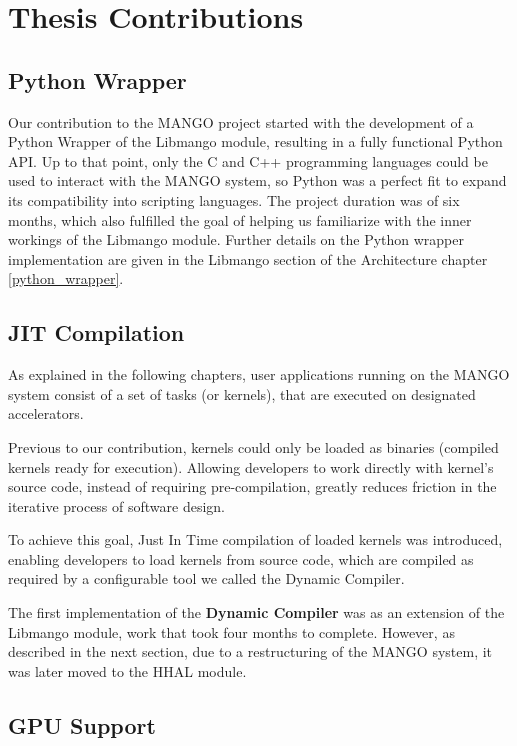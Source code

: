 \section{Thesis Contributions}
\subsection{Python Wrapper}

Our contribution to the MANGO project started with the development of a Python Wrapper of the Libmango module, resulting in a fully functional Python API. Up to that point, only the C and C++ programming languages could be used to interact with the MANGO system, so Python was a perfect fit to expand its compatibility into scripting languages. The project duration was of six months, which also fulfilled the goal of helping us familiarize with the inner workings of the Libmango module. Further details on the Python wrapper implementation are given in the Libmango section of the Architecture chapter \ref{python_wrapper}.

\subsection{JIT Compilation}

As explained in the following chapters, user applications running on the MANGO system consist of a set of tasks (or kernels), that are executed on designated accelerators. 

Previous to our contribution, kernels could only be loaded as binaries (compiled kernels ready for execution). 
Allowing developers to work directly with kernel's source code, instead of requiring pre-compilation, greatly reduces friction in the iterative process of software design.

To achieve this goal, Just In Time compilation of loaded kernels was introduced, enabling developers to load kernels from source code, which are compiled as required by a configurable tool we called the Dynamic Compiler.

The first implementation of the \textbf{Dynamic Compiler} was as an extension of the Libmango module, work that took four months to complete. However, as described in the next section, due to a restructuring of the MANGO system, it was later moved to the HHAL module.

\subsection{GPU Support}

